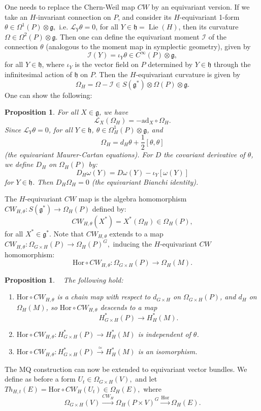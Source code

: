 \documentclass[a4paper,12pt,reqno,sumlimits]{amsart}
\theoremstyle{plain}
\newtheorem{prop}[thm]{Proposition}
\theoremstyle{definition}
\newcommand{\h}{{\mathbb H}}
\newcommand{\1}{{\bf 1}}
\newcommand{\g}{{\mathfrak  g}}
\renewcommand{\h}{{\mathfrak  h}}
\newcommand{\calI}{{\mathcal I}}
\newcommand{\calL}{{\mathcal L}}
\renewcommand{\to}{\longrightarrow}
\newcommand{\iso}{\stackrel{\simeq}{\longrightarrow}}
\newcommand{\Lie}{\operatorname{Lie}}
\numberwithin{equation}{section}
\begin{document}
One needs to replace the Chern-Weil map $CW$ by an equivariant version. If we
take an $H$-invariant connection on $P$, and consider its $H$-equivariant
1-form $\theta\in\Omega^1(P)\otimes\g,$ i.e. $\calL_Y\theta=0$, for all
$Y\in\h=\Lie(H)$, then its curvature $\Omega\in\Omega^2(P)\otimes\g.$ Then
one can define the equivariant moment $\calI$ of the connection $\theta$
(analogous to the moment map in symplectic geometry), given by
$$
\calI(Y)=\iota_Y\theta\in C^\infty(P)\otimes\g,
$$
for all $Y\in\h$, where $\iota_Y$ is the vector field on $P$ determined by
$Y\in\h$ through the infinitesimal action of $\h$ on $P$.  Then the
$H$-equivariant curvature is given by
$$
\Omega_H=\Omega-\calI\in S(\g^*)\otimes\Omega(P)\otimes\g.
$$
One can show the following:
\begin{prop}
  For all $X\in\g$, we have
  $$
  \calL_X(\Omega_H)=-\text{ad}_X\circ\Omega_H.
  $$
  Since $\calL_Y\theta=0$, for all $Y\in\h$,
  $\theta\in\Omega^1_H(P)\otimes\g$, and 
  $$
  \Omega_H=d_H\theta+\frac{1}{2}[\theta,\theta]
  $$
  (the equivariant Maurer-Cartan equations).
  For $D$ the covariant derivative of $\theta$, we define $D_H$ on
  $\Omega_H(P)$ by:
  $$
  D_H\omega(Y)=D\omega(Y)-\iota_Y[\omega(Y)]
  $$
  for $Y\in\h$. Then $D_H\Omega_H=0$ (the equivariant Bianchi identity).
\end{prop}

The $H$-equivariant $CW$ map is the algebra homomorphism
$CW_{H,\theta}:S(\g^*)\to\Omega_H(P)$ defined by:
$$
CW_{H,\theta}(X^*)=X^*(\Omega_H)\in\Omega_H(P),
$$
for all $X^*\in\g^*$.  Note that $CW_{H,\theta}$ extends to a map
$CW_{H,\theta}:\Omega_{G\times H}(P)\to\Omega_H(P)^G,$ inducing the
$H$-equivariant $CW$ homomorphism:
$$
\text{Hor}\circ CW_{H,\theta}:\Omega_{G\times H}(P)\to\Omega_H(M).
$$
\begin{prop}~\cite[p. 31]{radu}
  The following hold:
  \begin{enumerate}
  \item $\text{Hor}\circ CW_{H,\theta}$ is a chain map with respect to
    $d_{G\times H}$ on $\Omega_{G\times H}(P)$, and $d_H$ on $\Omega_H(M)$,
    so $\text{Hor}\circ CW_{H,\theta}$ descends to a map
    $$
    H^*_{G\times H}(P)\to H^*_H(M).
    $$
  \item $\text{Hor}\circ CW_{H,\theta}:H^*_{G\times H}(P)\to H^*_H(M)$ is
    independent of $\theta$.
  \item $\text{Hor}\circ CW_{H,\theta}:H^*_{G\times H}(P)\iso H^*_H(M)$ is an
    isomorphism.  
  \end{enumerate}
\end{prop}
The MQ construction can now be extended to equivariant vector bundles. We define
as before a form $U_t\in\Omega_{G\times H}(V),$ and let
$Th_{H,t}(E)=\text{Hor}\circ CW_{H}(U_t)\in\Omega_H(E),$ where
$$
\Omega_{G\times H}(V)\stackrel{CW_H}{\to}\Omega_H(P\times V)^G
\stackrel{\text{Hor}}{\to}\Omega_H(E).
$$
\end{document}
